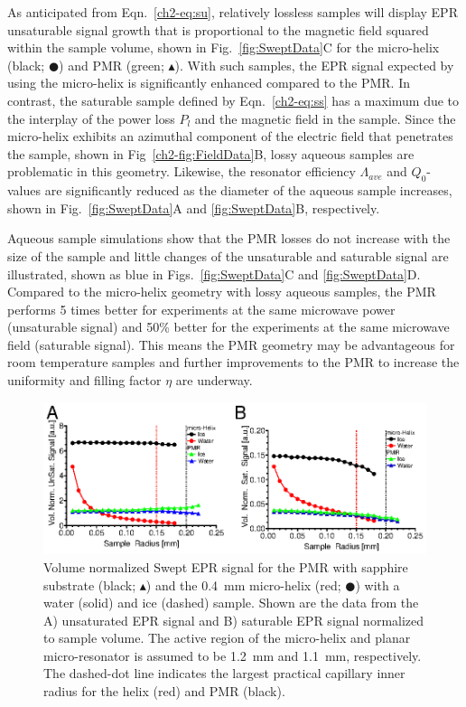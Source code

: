As anticipated from Eqn.~\ref{ch2-eq:su}, relatively lossless samples will display EPR unsaturable signal growth that is proportional to the magnetic field squared within the sample volume, shown in Fig.~\ref{fig:SweptData}C for the micro-helix (black; $\CIRCLE$) and PMR (green; $\blacktriangle$). With such samples, the EPR signal expected by using the micro-helix is significantly enhanced compared to the PMR. In contrast, the saturable sample defined by  Eqn.~\ref{ch2-eq:ss} has a maximum due to the interplay of the power loss $P_l$ and the magnetic field in the sample. Since the micro-helix exhibits an azimuthal component of the electric field that penetrates the sample, shown in Fig~\ref{ch2-fig:FieldData}B, lossy aqueous samples are problematic in this geometry. Likewise, the resonator efficiency $\Lambda_{ave}$ and $Q_0$-values are significantly reduced as the diameter of the aqueous sample increases, shown in Fig.~\ref{fig:SweptData}A and \ref{fig:SweptData}B, respectively.

Aqueous sample simulations show that the PMR losses do not increase with the size of the sample and little changes of the unsaturable and saturable signal are illustrated, shown as blue in Figs.~\ref{fig:SweptData}C and \ref{fig:SweptData}D. Compared to the micro-helix geometry with lossy aqueous samples, the PMR performs 5 times better for experiments at the same microwave power (unsaturable signal) and 50\% better for the experiments at the same microwave field (saturable signal). This means the PMR geometry may be advantageous for room temperature samples and further improvements to the PMR to increase the uniformity and filling factor $\eta$ are underway. 

\begin{figure}[htb]
 \centering
 \includegraphics[width=\textwidth]{Kapitel/Ch2-Images/Ch2-AbsSweepOutputA.eps}
 \caption[Volume normalized swept EPR signal optimization.]{Volume normalized Swept EPR signal for the PMR with sapphire substrate (black; $\blacktriangle$) and the 0.4~mm micro-helix (red; $\CIRCLE$) with a water (solid) and ice (dashed) sample. Shown are the data from the A) unsaturated EPR signal and B) saturable EPR signal normalized to sample volume. The active region of the micro-helix and planar micro-resonator is assumed to be 1.2~mm and 1.1~mm, respectively. The dashed-dot line indicates the largest practical capillary inner radius for the helix (red) and PMR (black).}
 \label{fig:AbsSweptData}
\end{figure}

